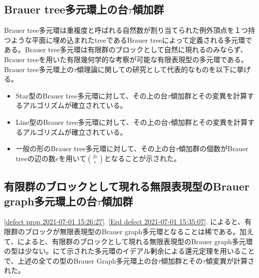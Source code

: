 \documentclass[a4paper,uplatex,dvipdfmx]{jsarticle}
\theoremstyle{definition}
\begin{document}
\subsection{Brauer tree多元環上の台\texorpdfstring{\(\tau\)}{τ}傾加群}
Brauer tree多元環は重複度と呼ばれる自然数が割り当てられた例外頂点を１つ持つような平面に埋め込まれたtreeであるBrauer treeによって定義される多元環である。Brauer tree多元環は有限群のブロックとして自然に現れるのみならず、Brauer treeを用いた有限幾何学的な考察が可能な有限表現型の多元環である。Brauer tree多元環上の\(\tau\)傾理論に関しての研究として代表的なものを以下に挙げる。
\begin{itemize}
  \item Star型のBrauer tree多元環に対して、その上の台\(\tau\)傾加群とその変異を計算するアルゴリズムが確立されている\cite{MR3461065}。
  \item Line型のBrauer tree多元環に対して、その上の台\(\tau\)傾加群とその変異を計算するアルゴリズムが確立されている\cite{aoki2018torsion}。
  \item 一般の形のBrauer tree多元環に対して、その上の台\(\tau\)傾加群の個数がBrauer treeの辺の数\(e\)を用いて\(\binom{2e}{e}\)となることが示された\cite{MR4057513}。
\end{itemize}
\subsection{有限群のブロックとして現れる無限表現型のBrauer graph多元環上の台\texorpdfstring{\(\tau\)}{τ}傾加群}
\cref{defect prop 2021-07-01 15:26:27}. \cref{Erd defect 2021-07-01 15:35:07}. によると、有限群のブロックが無限表現型のBrauer graph多元環となることは稀である。加えて、\cite{MR1064107}によると、有限群のブロックとして現れる無限表現型のBrauer graph多元環の型は少ない。\cite{MR3856858}にて示された多元環のイデアル剰余による還元定理を用いることで、上述の全ての型のBrauer Graph多元環上の台\(\tau\)傾加群とその\(\tau\)傾変異が計算された。
\end{document}
